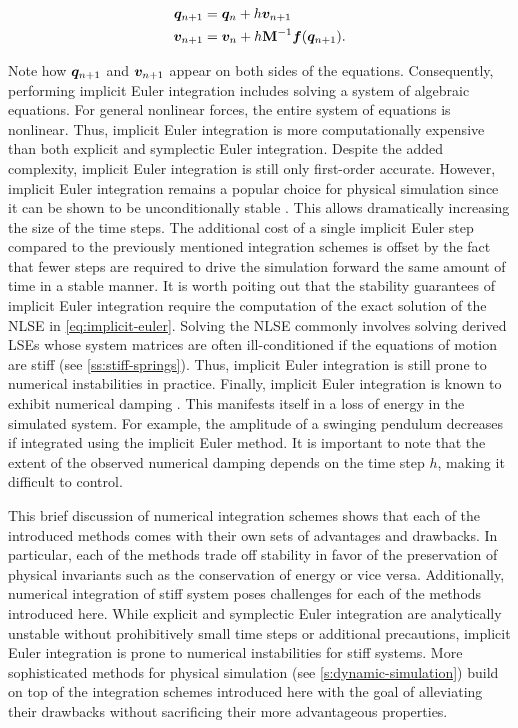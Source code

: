 \begin{align}
    \begin{split}\label{eq:implicit-euler}
        \bm{q}_{n+1} &= \bm{q}_n + h\bm{v}_{n+1}\\
        \bm{v}_{n+1} &= \bm{v}_n + h\mathbf{M}^{-1}\bm{f}(\bm{q}_{n+1}).
    \end{split}
\end{align}

\noindent Note how $\bm{q}_{n+1}$ and $\bm{v}_{n+1}$ appear on both sides of the equations. Consequently, performing implicit 
Euler integration includes solving a system of algebraic equations. For general nonlinear forces, the entire system of equations is nonlinear.
Thus, implicit Euler integration is more computationally expensive than both explicit and symplectic Euler integration. 
Despite the added complexity, implicit Euler integration is still only first-order accurate. However, implicit Euler integration 
remains a popular choice for physical simulation since it can be shown to be unconditionally stable \cite{chapra2005}. This allows 
dramatically increasing the size of the time steps. The additional cost of a single implicit Euler 
step compared to the previously mentioned integration schemes is offset by the fact that fewer steps are required to drive the 
simulation forward the same amount of time in a stable manner. It is worth poiting out that the stability guarantees of implicit Euler 
integration require the computation of the exact solution of the NLSE in \autoref{eq:implicit-euler}. Solving the NLSE commonly involves
solving derived LSEs whose system matrices are often ill-conditioned if the equations of motion are stiff (see \cref{ss:stiff-springs}). 
Thus, implicit Euler integration is still prone to numerical instabilities in practice. Finally, implicit Euler integration is known 
to exhibit numerical 
damping \cite{stern2006}. This manifests itself in a loss of energy in the simulated system. For example, the amplitude of a swinging 
pendulum decreases if integrated using the implicit Euler method. It is important to note that the extent of the observed numerical damping
depends on the time step $h$, making it difficult to control.

This brief discussion of numerical integration schemes shows that each of the introduced methods comes with their own sets of advantages and
drawbacks. In particular, each of the methods trade off stability in favor of the preservation of physical invariants such as the conservation
of energy or vice versa. Additionally, numerical integration of stiff system poses challenges for each of the methods introduced here. While
explicit and symplectic Euler integration are analytically unstable without prohibitively small time steps or additional
precautions, implicit Euler integration is prone to numerical instabilities for stiff systems. More sophisticated methods for physical 
simulation (see \cref{s:dynamic-simulation}) build on top of the integration schemes introduced here with the goal of alleviating their 
drawbacks without sacrificing their more advantageous properties. 


